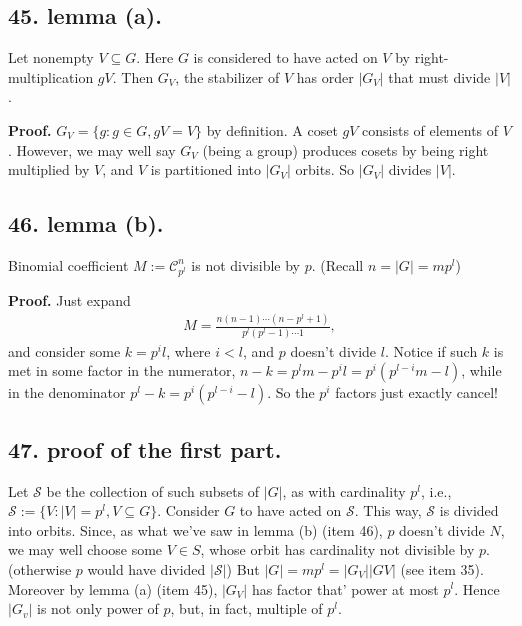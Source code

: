 \documentclass[12pt]{article}
\newcommand\F\frac%
\newcommand{\CF}[1]{ \mathcal{#1} }%
\newcommand{\SF}[1]{ \mathscr{#1} }%
\newcommand{\Ss}[1]{\textsf{\textbf{#1}}}%
\newcommand{\EqGo}[1]{ \begin{gather*}{#1}\end{gather*} } %
\begin{document}
\subsection*{45. lemma (a).} Let nonempty \( V \subseteq G \). 
Here \(G\) is considered to have acted on \(V\) by right-multiplication \(gV\). 
Then \(G_V\), the stabilizer of \(V\) has order \(|G_V|\) that must divide \(|V|\). \par
\Ss{Proof.} \( G_V = \{g: g\in G, gV = V\} \) by definition. 
A coset \(gV\) consists of elements of \(V\). 
However, we may well say \(G_V\) (being a group) produces cosets by being right multiplied by \(V\), 
and \(V\) is partitioned into \(|G_V|\) orbits. 
So \(|G_V|\) divides \(|V|\). \par

\subsection*{46. lemma (b).} Binomial coefficient \( M := \CF C_{p^l}^n \) is not divisible by \(p\). (Recall \(n=|G|=mp^l\)) \par
\Ss{Proof.} Just expand \EqGo{
 M = \F{ n(n-1)\dotsb(n-p^l+1) }{ p^l(p^l-1)\dotsb1 },
} and consider some \(k= p^i l\), where \(i<l\), and \(p\) doesn't divide \(l\). 
Notice if such \(k\) is met in some factor in the numerator, \(n-k = p^l m - p^i l = p^i (p^{l-i} m - l)\), 
while in the denominator \(p^l - k = p^i (p^{l-i} - l)\). 
So the \(p^i\) factors just exactly cancel! 

\subsection*{47. proof of the first part.} Let \(\SF S\) be the collection of such subsets of \(|G|\), as with cardinality \(p^l\), i.e., \(\SF S := \{ V: |V|=p^l, V \subseteq G\}\). 
Consider \(G\) to have acted on \(\SF S\). 
This way, \(\SF S\) is divided into orbits. 
Since, as what we've saw in lemma (b) (item 46), \(p\) doesn't divide \(N\), we may well choose some \(V \in S\), whose orbit has cardinality not divisible by \(p\). 
(otherwise \(p\) would have divided \(|\SF S|\)) 
But \(|G| = mp^l = |G_V| |GV|\) (see item 35). 
Moreover by lemma (a) (item 45), \(|G_V|\) has factor that' power at most \(p^l\). 
Hence \(|G_v|\) is not only power of \(p\), but, in fact, multiple of \(p^l\). 
\end{document}
